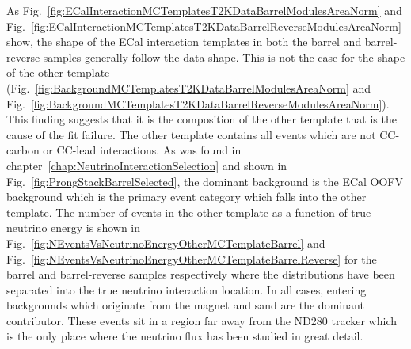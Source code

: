 As Fig.~\ref{fig:ECalInteractionMCTemplatesT2KDataBarrelModulesAreaNorm} and Fig.~\ref{fig:ECalInteractionMCTemplatesT2KDataBarrelReverseModulesAreaNorm} show, the shape of the ECal interaction templates in both the barrel and barrel-reverse samples generally follow the data shape.  This is not the case for the shape of the other template (Fig.~\ref{fig:BackgroundMCTemplatesT2KDataBarrelModulesAreaNorm} and Fig.~\ref{fig:BackgroundMCTemplatesT2KDataBarrelReverseModulesAreaNorm}).  This finding suggests that it is the composition of the other template that is the cause of the fit failure.  The other template contains all events which are not CC-carbon or CC-lead interactions.  As was found in chapter~\ref{chap:NeutrinoInteractionSelection} and shown in Fig.~\ref{fig:ProngStackBarrelSelected}, the dominant background is the ECal OOFV background which is the primary event category which falls into the other template.  The number of events in the other template as a function of true neutrino energy is shown in Fig.~\ref{fig:NEventsVsNeutrinoEnergyOtherMCTemplateBarrel} and Fig.~\ref{fig:NEventsVsNeutrinoEnergyOtherMCTemplateBarrelReverse} for the barrel and barrel-reverse samples respectively where the distributions have been separated into the true neutrino interaction location.  In all cases, entering backgrounds which originate from the magnet and sand are the dominant contributor.  These events sit in a region far away from the ND280 tracker which is the only place where the neutrino flux has been studied in great detail. 
